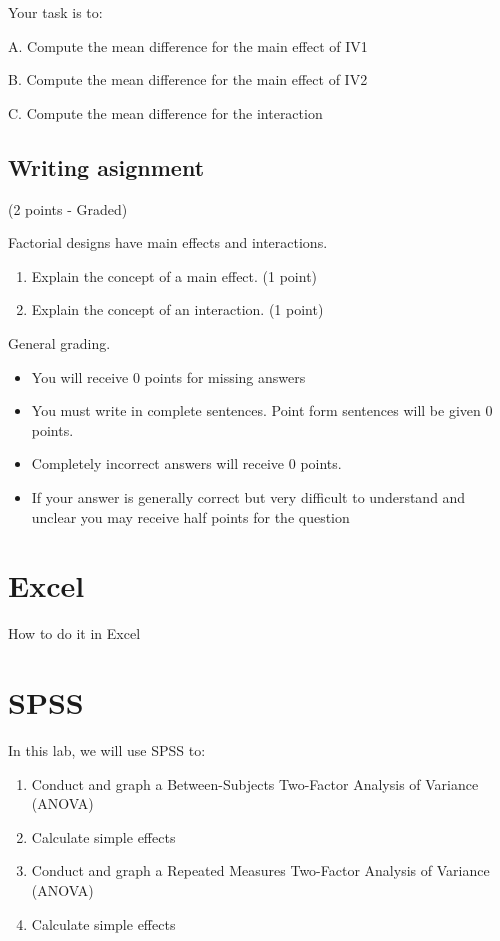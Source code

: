 \documentclass[
]{book}
\providecommand{\tightlist}{%
  \setlength{\itemsep}{0pt}\setlength{\parskip}{0pt}}
\begin{document}
Your task is to:

A. Compute the mean difference for the main effect of IV1

B. Compute the mean difference for the main effect of IV2

C. Compute the mean difference for the interaction

\hypertarget{writing-asignment}{%
\subsection{Writing asignment}\label{writing-asignment}}

(2 points - Graded)

Factorial designs have main effects and interactions.

\begin{enumerate}
\def\labelenumi{\arabic{enumi}.}
\item
  Explain the concept of a main effect. (1 point)
\item
  Explain the concept of an interaction. (1 point)
\end{enumerate}

General grading.

\begin{itemize}
\tightlist
\item
  You will receive 0 points for missing answers
\item
  You must write in complete sentences. Point form sentences will be given 0 points.
\item
  Completely incorrect answers will receive 0 points.
\item
  If your answer is generally correct but very difficult to understand and unclear you may receive half points for the question
\end{itemize}

\hypertarget{excel-10}{%
\section{Excel}\label{excel-10}}

How to do it in Excel

\hypertarget{spss-10}{%
\section{SPSS}\label{spss-10}}

In this lab, we will use SPSS to:

\begin{enumerate}
\def\labelenumi{\arabic{enumi}.}
\tightlist
\item
  Conduct and graph a Between-Subjects Two-Factor Analysis of Variance (ANOVA)
\item
  Calculate simple effects
\item
  Conduct and graph a Repeated Measures Two-Factor Analysis of Variance (ANOVA)
\item
  Calculate simple effects
\end{enumerate}
\end{document}
